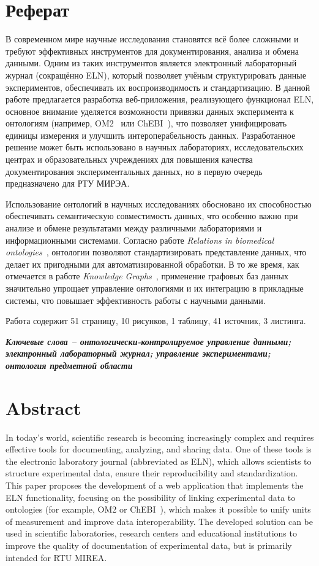 \section*{\centering Реферат}
В современном мире научные исследования становятся всё более сложными и требуют эффективных инструментов для документирования, анализа и обмена данными. Одним из таких инструментов является электронный лабораторный журнал (сокращённо ELN), который позволяет учёным структурировать данные экспериментов, обеспечивать их воспроизводимость и стандартизацию. В данной работе предлагается разработка веб-приложения, реализующего функционал ELN, основное внимание уделяется возможности привязки данных эксперимента к онтологиям (например, OM2~\cite{ontology:OM2} или ChEBI~\cite{ontology:СhEBI}), что позволяет унифицировать единицы измерения и улучшить интероперабельность данных. Разработанное решение может быть использовано в научных лабораториях, исследовательских центрах и образовательных учреждениях для повышения качества документирования экспериментальных данных, но в первую очередь предназначено для РТУ МИРЭА.

Использование онтологий в научных исследованиях обосновано их способностью обеспечивать семантическую совместимость данных, что особенно важно при анализе и обмене результатами между различными лабораториями и информационными системами. Согласно работе \textit{Relations in biomedical ontologies}~\cite{ontology:base1}, онтологии позволяют стандартизировать представление данных, что делает их пригодными для автоматизированной обработки. В то же время, как отмечается в работе \textit{Knowledge Graphs}~\cite{ontology:base2}, применение графовых баз данных значительно упрощает управление онтологиями и их интеграцию в прикладные системы, что повышает эффективность работы с научными данными.

Работа содержит 51 страницу, 10 рисунков, 1 таблицу, 41 источник, 3 листинга.

\textit{\textbf{Ключевые слова -- онтологически-контролируемое управление данными; электронный лабораторный журнал; управление экспериментами; онтология предметной области}}

\newpage

\section*{\centering Abstract}
In today's world, scientific research is becoming increasingly complex and requires effective tools for documenting, analyzing, and sharing data. One of these tools is the electronic laboratory journal (abbreviated as ELN), which allows scientists to structure experimental data, ensure their reproducibility and standardization. This paper proposes the development of a web application that implements the ELN functionality, focusing on the possibility of linking experimental data to ontologies (for example, OM2\cite{ontology:OM2} or ChEBI~\cite{ontology:СhEBI}), which makes it possible to unify units of measurement and improve data interoperability. The developed solution can be used in scientific laboratories, research centers and educational institutions to improve the quality of documentation of experimental data, but is primarily intended for RTU MIREA.

